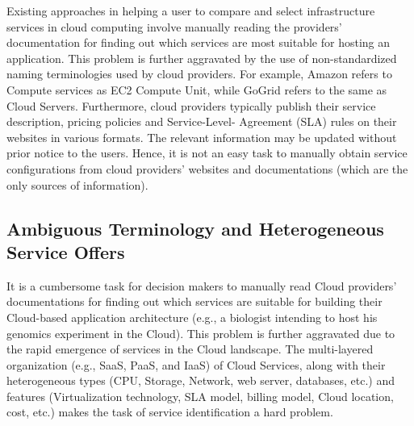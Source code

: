 Existing approaches in helping a user to compare and select infrastructure services
in cloud computing involve manually reading the providers' documentation for finding
out which services are most suitable for hosting an application. This problem is
further aggravated by the use of non-standardized naming terminologies used by
cloud providers. 
For example, Amazon refers to Compute services as EC2 Compute
Unit, while GoGrid refers to the same as Cloud Servers. Furthermore, cloud providers
typically publish their service description, pricing policies and Service-Level-
Agreement (SLA) rules on their websites in various formats. The relevant information
may be updated without prior notice to the users. Hence, it is not an easy task to
manually obtain service configurations from cloud providers’ websites and
documentations (which are the only sources of information).

\subsection{Ambiguous Terminology and Heterogeneous Service Offers}
\label{subsec:service_discovery}
It is a cumbersome task for decision makers to manually
read Cloud providers’ documentations for finding out which
services are suitable for building their Cloud-based
application architecture (e.g., a biologist intending to host his
genomics experiment in the Cloud). This problem is further
aggravated due to the rapid emergence of services in the
Cloud landscape. The multi-layered organization (e.g., SaaS,
PaaS, and IaaS) of Cloud Services, along with their
heterogeneous types (CPU, Storage, Network, web server,
databases, etc.) and features (Virtualization technology, SLA
model, billing model, Cloud location, cost, etc.) makes the
task of service identification a hard problem. 

